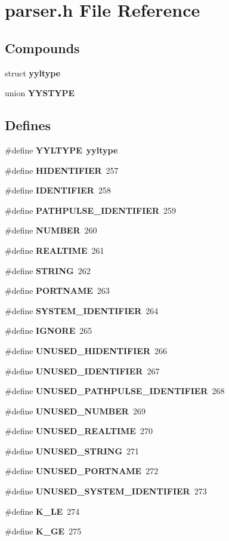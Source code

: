 \section{parser.h File Reference}
\label{parser_8h}
\subsection*{Compounds}
\begin{CompactItemize}
\item 
struct {\bf yyltype}
\item 
union {\bf YYSTYPE}
\end{CompactItemize}
\subsection*{Defines}
\begin{CompactItemize}
\item 
\#define {\bf YYLTYPE}\ {\bf yyltype}
\item 
\#define {\bf HIDENTIFIER}\ 257
\item 
\#define {\bf IDENTIFIER}\ 258
\item 
\#define {\bf PATHPULSE\_\-IDENTIFIER}\ 259
\item 
\#define {\bf NUMBER}\ 260
\item 
\#define {\bf REALTIME}\ 261
\item 
\#define {\bf STRING}\ 262
\item 
\#define {\bf PORTNAME}\ 263
\item 
\#define {\bf SYSTEM\_\-IDENTIFIER}\ 264
\item 
\#define {\bf IGNORE}\ 265
\item 
\#define {\bf UNUSED\_\-HIDENTIFIER}\ 266
\item 
\#define {\bf UNUSED\_\-IDENTIFIER}\ 267
\item 
\#define {\bf UNUSED\_\-PATHPULSE\_\-IDENTIFIER}\ 268
\item 
\#define {\bf UNUSED\_\-NUMBER}\ 269
\item 
\#define {\bf UNUSED\_\-REALTIME}\ 270
\item 
\#define {\bf UNUSED\_\-STRING}\ 271
\item 
\#define {\bf UNUSED\_\-PORTNAME}\ 272
\item 
\#define {\bf UNUSED\_\-SYSTEM\_\-IDENTIFIER}\ 273
\item 
\#define {\bf K\_\-LE}\ 274
\item 
\#define {\bf K\_\-GE}\ 275
\item 

\end{CompactItemize}
